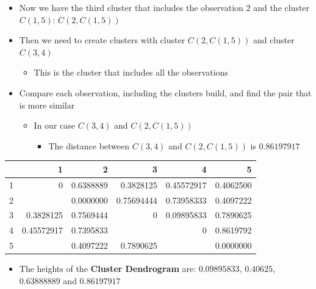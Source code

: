 \documentclass[
  ignorenonframetext,
]{beamer}
\providecommand{\tightlist}{%
  \setlength{\itemsep}{0pt}\setlength{\parskip}{0pt}}\usepackage{longtable,booktabs,array}
\begin{document}
\begin{frame}{}
\label{section-28}
\begin{itemize}
\item
  Now we have the third cluster that includes the observation \(2\) and
  the cluster \(C(1,5)\): \(C(2, C(1,5))\)
\item
  Then we need to create clusters with cluster \(C(2, C(1,5))\) and
  cluster \(C(3,4)\)

  \begin{itemize}
  \tightlist
  \item
    This is the cluster that includes all the observations
  \end{itemize}
\end{itemize}
\end{frame}

\begin{frame}{}
\label{section-29}
\begin{itemize}
\item
  Compare each observation, including the clusters build, and find the
  pair that is more similar

  \begin{itemize}
  \item
    In our case \(C(3,4)\) and \(C(2, C(1,5))\)

    \begin{itemize}
    \tightlist
    \item
      The distance between \(C(3,4)\) and \(C(2, C(1,5))\) is
      \(0.86197917\)
    \end{itemize}
  \end{itemize}
\end{itemize}

\begin{table}
\centering
\begin{tabular}[t]{rrrrrr}
\toprule
  & 1 & 2 & 3 & 4 & 5\\
\midrule
1 & 0 & 0.6388889 & 0.3828125 & 0.45572917 & 0.4062500\\
2 & \cellcolor[HTML]{18BC9C}{\textcolor{white}{0.63888889}} & 0.0000000 & 0.75694444 & 0.73958333 & 0.4097222\\
3 & 0.3828125 & 0.7569444 & 0 & 0.09895833 & 0.7890625\\
4 & 0.45572917 & 0.7395833 & \cellcolor[HTML]{2C3E50}{\textcolor{white}{0.09895833}} & 0 & 0.8619792\\
5 & \cellcolor[HTML]{E31A1C}{\textcolor{white}{0.40625}} & 0.4097222 & 0.7890625 & \cellcolor[HTML]{CCBE93}{\textcolor{white}{0.86197917}} & 0.0000000\\
\bottomrule
\end{tabular}
\end{table}

\begin{itemize}
\tightlist
\item
  The heights of the \textbf{Cluster Dendrogram} are: \(0.09895833\),
  \(0.40625\), \(0.63888889\) and \(0.86197917\)
\end{itemize}
\end{frame}
\end{document}
